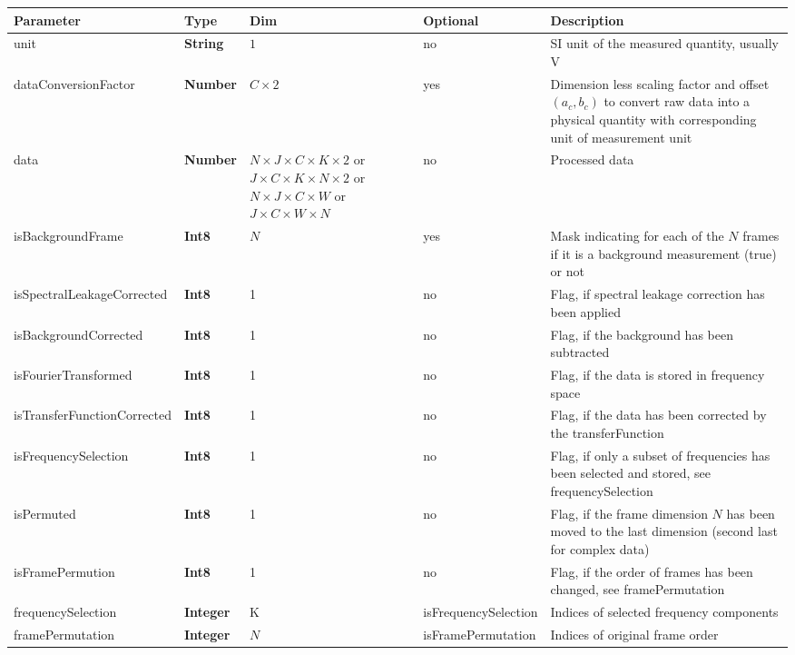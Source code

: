 \documentclass[landscape,a4paper]{article} %
\newcommand{\inltab}[1]{{\ttfamily\bfseries\color{blue}#1}}
\newcommand{\inlvar}[1]{{\ttfamily#1}}
\begin{document}
\noindent \begin{tabularx}{\columnwidth}{llp{3cm}lX} 
\textbf{Parameter} & \textbf{Type} & \textbf{Dim} &  \textbf{Optional} & \textbf{Description} \\ \hline 
\inlvar{unit} & \inltab{String} & $1$ & no & SI unit of the measured quantity, usually V \\ \hline 
\inlvar{dataConversionFactor} & \inltab{Number} & $C \times 2$ & yes & Dimension less scaling factor and offset $(a_c, b_c)$ to convert raw data into a physical quantity with corresponding unit of measurement \inlvar{unit} \\ \hline 
\inlvar{data} & \inltab{Number} & $N \times J \times C \times K\times 2$ or $ J \times C \times K\times N \times 2$ or $N \times J \times C \times W$ or $ J \times C \times W \times N$ & no & Processed data \\ \hline
\inlvar{isBackgroundFrame} & \inltab{Int8} & $N$ & yes & Mask indicating for each of the $N$ frames if it is a background measurement (true) or not \\ \hline
\inlvar{isSpectralLeakageCorrected} & \inltab{Int8} & 1 & no & Flag, if spectral leakage correction has been applied \\ \hline
\inlvar{isBackgroundCorrected} & \inltab{Int8} & 1 & no & Flag, if the background has been subtracted \\ \hline
\inlvar{isFourierTransformed} & \inltab{Int8} & 1 & no & Flag, if the data is stored in frequency space \\ \hline
\inlvar{isTransferFunctionCorrected} & \inltab{Int8} & 1 & no & Flag, if the data has been corrected by the \inlvar{transferFunction}\\ \hline 
\inlvar{isFrequencySelection} & \inltab{Int8} & 1 & no & Flag, if only a subset of frequencies has been selected and stored, see \inlvar{frequencySelection}\\ \hline 
\inlvar{isPermuted} & \inltab{Int8} & 1 & no & Flag, if the frame dimension $N$ has been moved to the last dimension (second last for complex data) \\ \hline
\inlvar{isFramePermution} & \inltab{Int8} & 1 & no & Flag, if the order of frames has been changed, see \inlvar{framePermutation} \\ \hline 
\inlvar{frequencySelection} & \inltab{Integer} & K & \inlvar{isFrequencySelection} & Indices of selected frequency components \\ \hline
\inlvar{framePermutation} & \inltab{Integer} & $N$ & \inlvar{isFramePermutation} & Indices of original frame order\\ \hline
\end{tabularx} 
\end{document}

